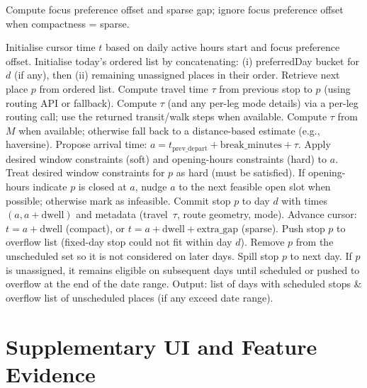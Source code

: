 \begin{appendices}
\begin{algorithm}[H]
\begin{algorithmic}[1]
\STATE Compute focus preference offset and sparse gap; ignore focus preference offset when compactness = sparse.

  \STATE Initialise cursor time $t$ based on daily active hours start and focus preference offset.
  \STATE Initialise today's ordered list by concatenating: (i) preferredDay bucket for $d$ (if any), then (ii) remaining unassigned places in their order.
    \STATE Retrieve next place $p$ from ordered list.
    \STATE Compute travel time $\tau$ from previous stop to $p$ (using routing API or fallback).
      \STATE Compute $\tau$ (and any per-leg mode details) via a per-leg routing call; use the returned transit/walk steps when available.
    \ELSE
      \STATE Compute $\tau$ from $M$ when available; otherwise fall back to a distance-based estimate (e.g., haversine).
    \ENDIF
    \STATE Propose arrival time: $a = t_{\text{prev\_depart}} + \text{break\_minutes} + \tau$.
    \STATE Apply desired window constraints (soft) and opening-hours constraints (hard) to $a$.
      \STATE Treat desired window constraints for $p$ as hard (must be satisfied).
    \ENDIF
    \STATE If opening-hours indicate $p$ is closed at $a$, nudge $a$ to the next feasible open slot when possible; otherwise mark as infeasible.
      \STATE Commit stop $p$ to day $d$ with times $(a, a + \text{dwell})$ and metadata (travel~$\tau$, route geometry, mode).
      \STATE Advance cursor: $t = a + \text{dwell}$ (compact), or $t = a + \text{dwell} + \text{extra\_gap}$ (sparse).
    \ELSE
        \STATE Push stop $p$ to overflow list (fixed-day stop could not fit within day $d$).
        \STATE Remove $p$ from the unscheduled set so it is not considered on later days.
      \ENDIF
      \STATE Spill stop $p$ to next day.
      \STATE If $p$ is unassigned, it remains eligible on subsequent days until scheduled or pushed to overflow at the end of the date range.
    \ENDIF
  \ENDWHILE
\ENDFOR
\STATE Output: list of days with scheduled stops \& overflow list of unscheduled places (if any exceed date range).
\end{algorithmic}
\end{algorithm}

\section{Supplementary UI and Feature Evidence}
\label{app:supp-ui-evidence}


\end{appendices}
